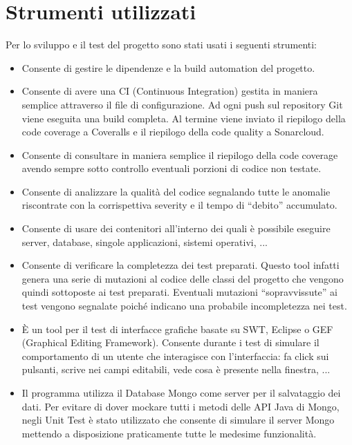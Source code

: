 \section{Strumenti utilizzati}
Per lo sviluppo e il test del progetto sono stati usati i seguenti strumenti:
\begin{itemize}
	\item[\tool{Maven}] Consente di gestire le dipendenze e la build automation del progetto.

	\item[\tool{Travis}] Consente di avere una CI (Continuous Integration) gestita in maniera semplice attraverso il file di configurazione. Ad ogni push sul repository Git viene eseguita una build completa. Al termine viene inviato il riepilogo della code coverage a Coveralls e il riepilogo della code quality a Sonarcloud.

	\item[\tool{Coveralls}] Consente di consultare in maniera semplice il riepilogo della code coverage avendo sempre sotto controllo eventuali porzioni di codice non testate.

	\item[\tool{Sonar}] Consente di analizzare la qualità del codice segnalando tutte le anomalie riscontrate con la corrispettiva severity e il tempo di ``debito'' accumulato.

	\item[\tool{Docker}] Consente di usare dei contenitori all'interno dei quali è possibile eseguire server, database, singole applicazioni, sistemi operativi, ...

	\item[\tool{PIT}] Consente di verificare la completezza dei test preparati. Questo tool infatti genera una serie di mutazioni al codice delle classi del progetto che vengono quindi sottoposte ai test preparati. Eventuali mutazioni ``sopravvissute'' ai test vengono segnalate poiché indicano una probabile incompletezza nei test.

	\item[\tool{SWTBot}] È un tool per il test di interfacce grafiche basate su SWT, Eclipse o GEF (Graphical Editing Framework). Consente durante i test di simulare il comportamento di un utente che interagisce con l'interfaccia: fa click sui pulsanti, scrive nei campi editabili, vede cosa è presente nella finestra, ...
	
	\item[\tool{Fongo}] Il programma utilizza il Database Mongo come server per il salvataggio dei dati. Per evitare di dover mockare tutti i metodi delle API Java di Mongo, negli Unit Test è stato utilizzato  che consente di simulare il server Mongo mettendo a disposizione praticamente tutte le medesime funzionalità.
\end{itemize}

